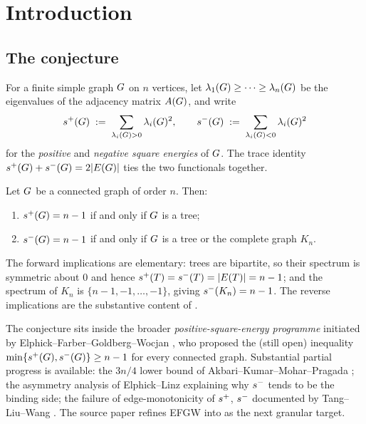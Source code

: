 \section{Introduction}\label{sec:intro}

\subsection{The conjecture}\label{sec:intro:conjecture}

For a finite simple graph $G$ on $n$ vertices, let
$\lambda_{1}(G) \ge \cdots \ge \lambda_{n}(G)$ be the
eigenvalues of the adjacency matrix $A(G)$, and write
\[
s^{+}(G) \;:=\; \sum_{\lambda_{i}(G) > 0} \lambda_{i}(G)^{2},
\qquad
s^{-}(G) \;:=\; \sum_{\lambda_{i}(G) < 0} \lambda_{i}(G)^{2}
\]
for the \emph{positive} and \emph{negative square energies} of $G$.
The trace identity $s^{+}(G) + s^{-}(G) = 2|E(G)|$
ties the two functionals together.

\begin{conjecture}\label{conj:92}
Let $G$ be a connected graph of order $n$. Then:
\begin{enumerate}[label=(\roman*)]
\item $s^{+}(G) = n - 1$ if and only if $G$ is a tree;
\item $s^{-}(G) = n - 1$ if and only if $G$ is a tree or
the complete graph $K_{n}$.
\end{enumerate}
\end{conjecture}

The forward implications are elementary: trees are bipartite, so their
spectrum is symmetric about $0$ and hence $s^{+}(T) = s^{-}(T) =
|E(T)| = n - 1$; and the spectrum of $K_{n}$ is $\{n - 1, -1, \ldots, -1\}$,
giving $s^{-}(K_{n}) = n - 1$. The reverse implications are the
substantive content of .

The conjecture sits inside the broader \emph{positive-square-energy
programme} initiated by Elphick--Farber--Goldberg--Wocjan
\cite{EFGW2016}, who proposed the (still open) inequality
$\min\{s^{+}(G), s^{-}(G)\} \ge n - 1$ for every connected
graph. Substantial partial progress is available: the $3n/4$ lower
bound of Akbari--Kumar--Mohar--Pragada \cite{AKMP2024}; the
asymmetry analysis of Elphick--Linz \cite{ElphickLinz2023} explaining
why $s^{-}$ tends to be the binding side; the failure of
edge-monotonicity of $s^{+}$, $s^{-}$ documented by Tang--Liu--Wang
\cite{TLW2024}. The source paper \cite{AKMPZ2025} refines EFGW into
 as the next granular target.


